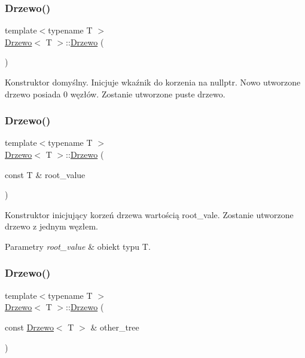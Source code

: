 \subsubsection{\texorpdfstring{Drzewo()}{Drzewo()}\hspace{0.1cm}{\footnotesize\ttfamily [1/3]}}
{\footnotesize\ttfamily template$<$typename T $>$ \\
\hyperlink{class_drzewo}{Drzewo}$<$ T $>$\+::\hyperlink{class_drzewo}{Drzewo} (\begin{DoxyParamCaption}{ }\end{DoxyParamCaption})}

Konstruktor domyślny. Inicjuje wkaźnik do korzenia na \textquotesingle{}nullptr\textquotesingle{}. Nowo utworzone drzewo posiada 0 węzłów. Zostanie utworzone puste drzewo. \mbox{\label{class_drzewo_a18f9e596cec9dd18eed19f2b613a7c44}} 
\subsubsection{\texorpdfstring{Drzewo()}{Drzewo()}\hspace{0.1cm}{\footnotesize\ttfamily [2/3]}}
{\footnotesize\ttfamily template$<$typename T $>$ \\
\hyperlink{class_drzewo}{Drzewo}$<$ T $>$\+::\hyperlink{class_drzewo}{Drzewo} (\begin{DoxyParamCaption}\item[{const T \&}]{root\+\_\+value }\end{DoxyParamCaption})}

Konstruktor inicjujący korzeń drzewa wartością \textquotesingle{}root\+\_\+vale\textquotesingle{}. Zostanie utworzone drzewo z jednym węzłem.


\begin{DoxyParams}{Parametry}
{\em root\+\_\+value} & obiekt typu T. \\
\hline
\end{DoxyParams}
\mbox{\label{class_drzewo_a337d26f83b35b414b729a147e8995c3e}} 
\subsubsection{\texorpdfstring{Drzewo()}{Drzewo()}\hspace{0.1cm}{\footnotesize\ttfamily [3/3]}}
{\footnotesize\ttfamily template$<$typename T $>$ \\
\hyperlink{class_drzewo}{Drzewo}$<$ T $>$\+::\hyperlink{class_drzewo}{Drzewo} (\begin{DoxyParamCaption}\item[{const \hyperlink{class_drzewo}{Drzewo}$<$ T $>$ \&}]{other\+\_\+tree }\end{DoxyParamCaption})}

